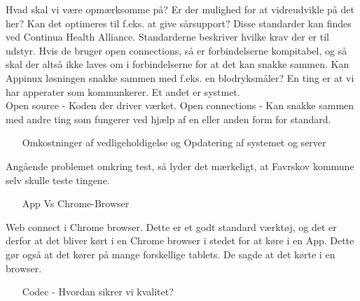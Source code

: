 Hvad skal vi være opmærksomme på? Er der mulighed for at vidreudvikle på det her? Kan det optimeres til f.eks. at give sårsupport? Disse standarder kan findes ved Continua Health Alliance. Standarderne beskriver hvilke krav der er til udstyr. Hvis de bruger open connections, så er forbindelserne kompitabel, og så skal der altså ikke laves om i forbindelserne for at det kan snakke sammen. Kan Appinux løsningen snakke sammen med f.eks. en blodryksmåler? En ting er at vi har apperater som kommunkerer. Et andet er systmet.
\\
Open source - Koden der driver værket. 
Open connections - Kan snakke sammen med andre ting som fungerer ved hjælp af en eller anden form for standard.\\
\begin{itemize}
\item[Omkostninger af vedligeholdigelse og Opdatering af systemet og server]
\end{itemize}
Angående problemet omkring test, så lyder det mærkeligt, at Favrskov kommune selv skulle teste tingene. \\
\begin{itemize}
\item[App Vs Chrome-Browser]
\end{itemize}
Web connect i Chrome browser. Dette er et godt standard værktøj, og det er derfor at det bliver kørt i en Chrome browser i stedet for at køre i en App. Dette gør også at det kører på mange forskellige tablets. De sagde at det kørte i en browser. 
\begin{itemize}
\item[Codec - Hvordan sikrer vi kvalitet?]
\end{itemize}

